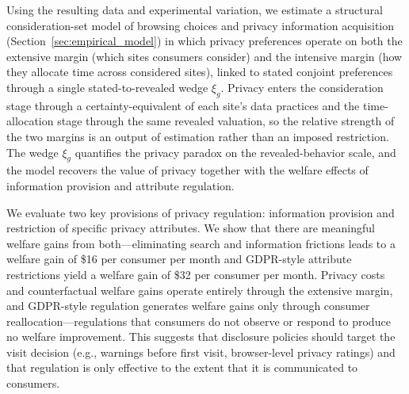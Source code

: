 \documentclass[12pt]{article}
\theoremstyle{definition}
\theoremstyle{remark}
\begin{document}
Using the resulting data and experimental variation, we estimate a structural consideration-set model of browsing choices and privacy information acquisition (Section~\ref{sec:empirical_model}) in which privacy preferences operate on both the extensive margin (which sites consumers consider) and the intensive margin (how they allocate time across considered sites), linked to stated conjoint preferences through a single stated-to-revealed wedge $\xi_g$. Privacy enters the consideration stage through a certainty-equivalent of each site's data practices and the time-allocation stage through the same revealed valuation, so the relative strength of the two margins is an output of estimation rather than an imposed restriction. The wedge $\xi_g$ quantifies the privacy paradox on the revealed-behavior scale, and the model recovers the value of privacy together with the welfare effects of information provision and attribute regulation.

We evaluate two key provisions of privacy regulation: information provision and restriction of specific privacy attributes. We show that there are meaningful welfare gains from both---eliminating search and information frictions leads to a welfare gain of \$16 per consumer per month and GDPR-style attribute restrictions yield a welfare gain of \$32 per consumer per month. Privacy costs and counterfactual welfare gains operate entirely through the extensive margin, and GDPR-style regulation generates welfare gains only through consumer reallocation---regulations that consumers do not observe or respond to produce no welfare improvement. This suggests that disclosure policies should target the visit decision (e.g., warnings before first visit, browser-level privacy ratings) and that regulation is only effective to the extent that it is communicated to consumers.
\end{document}

